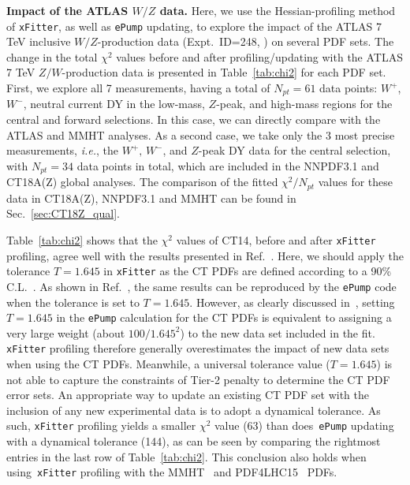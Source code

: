 {\bf Impact of the ATLAS $W/Z$ data.}
Here, we use the Hessian-profiling method of \texttt{xFitter}, as well as \texttt{ePump} updating, to explore the impact of the ATLAS 7 TeV inclusive $W/Z$-production data (Expt.~ID=248, \cite{Aaboud:2016btc})
on several PDF sets. The change in the total $\chi^{2}$ values before and after profiling/updating with the ATLAS 7 TeV $Z/W$-production data
is presented in Table~\ref{tab:chi2} for each PDF set. 
First, we explore all 7 measurements, having a total of $N_\textit{pt}=61$ data points: $W^{+}$, $W^{-}$, neutral current DY in the low-mass, $Z$-peak, and high-mass regions
for the central and forward selections. In this case, we can directly compare with the ATLAS \cite{Aaboud:2016btc} and MMHT \cite{Thorne:2019mpt} analyses. 
As a second case, we take only the 3 most precise measurements, {\it i.e.}, the $W^{+},\, W^{-}$, and $Z$-peak DY data for the central selection, with $N_{\textit{pt}}=34$ data points in total,
which are included in the NNPDF3.1 \cite{Ball:2017nwa} and CT18A(Z) global analyses. The comparison of the fitted $\chi^2/N_{\textit{pt}}$ values for these data in CT18A(Z), NNPDF3.1 and
MMHT can be found in Sec.~\ref{sec:CT18Z_qual}.

Table~\ref{tab:chi2} shows that the $\chi^{2}$ values of CT14, before and after \texttt{xFitter} profiling, agree well with the results presented in Ref.~\cite{Aaboud:2016btc}.
Here, we should apply the tolerance $T=1.645$ in \texttt{xFitter} as the CT PDFs are defined according to a 90\%
C.L.~\cite{Dulat:2015mca,Hou:2016nqm}. 
As shown in Ref.~\cite{Hou:2019gfw}, the same results can be reproduced by the \texttt{ePump}
code when the tolerance is set to $T\! =\! 1.645$. However, as clearly discussed in~\cite{Hou:2019gfw}, setting $T=1.645$ in the \texttt{ePump} calculation for the CT PDFs is equivalent to
assigning a very large weight (about $100/1.645^2$) to the new data set included in the fit.
\texttt{xFitter} profiling therefore generally overestimates the impact of new data sets when using the CT PDFs.
Meanwhile, a universal tolerance value ($T=1.645$) is not able to capture the constraints of Tier-2 penalty to determine the CT PDF error sets.
An appropriate way to update an existing CT PDF set with the
inclusion of any new experimental data is to adopt a dynamical tolerance.
As such, \texttt{xFitter} profiling yields a smaller $\chi^2$ value (63) than
does~\texttt{ePump} updating with a dynamical tolerance (144), as can be seen by comparing the rightmost entries in the last row of Table~\ref{tab:chi2}.
This conclusion also holds when using~\texttt{xFitter} profiling with the MMHT~\cite{Harland-Lang:2014zoa} and PDF4LHC15~\cite{Butterworth:2015oua} PDFs.

